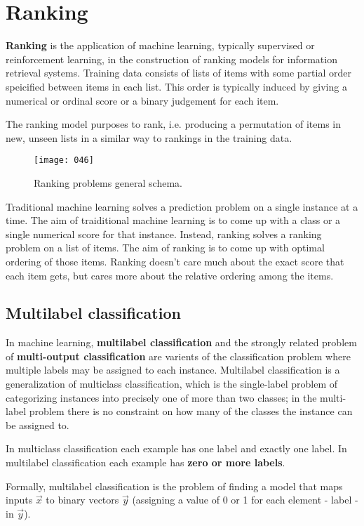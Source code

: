 \chapter{Ranking}
\textbf{Ranking} is the application of machine learning, typically supervised or reinforcement learning, in the construction of ranking models for information retrieval systems. Training data consists of lists of items with some partial order speicified between items in each list. This order is typically induced by giving a numerical or ordinal score or a binary judgement for each item. 

The ranking model purposes to rank, i.e. producing a permutation of items in new, unseen lists in a similar way to rankings in the training data.

\begin{figure}[h]
    \centering
    \texttt{[image: 046]}
    \caption{Ranking problems general schema.}
\end{figure}

Traditional machine learning solves a prediction problem on a single instance at a time. The aim of traiditional machine learning is to come up with a class or a single numerical score for that instance. Instead, ranking solves a ranking problem on a list of items. The aim of ranking is to come up with optimal ordering of those items. Ranking doesn't care much about the exact score that each item gets, but cares more about the relative ordering among the items.

\section{Multilabel classification}
In machine learning, \textbf{multilabel classification} and the strongly related problem of \textbf{multi-output classification} are varients of the classification problem where multiple labels may be assigned to each instance. Multilabel classification is a generalization of multiclass classification, which is the single-label problem of categorizing instances into precisely one of more than two classes; in the multi-label problem there is no constraint on how many of the classes the instance can be assigned to.

In multiclass classification each example has one label and exactly one label. In multilabel classification each example has \textbf{zero or more labels}.

Formally, multilabel classification is the problem of finding a model that maps inputs \(\vec{x}\) to binary vectors \(\vec{y}\) (assigning a value of 0 or 1 for each element - label - in \(\vec{y}\)).

